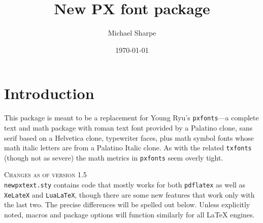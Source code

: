 \documentclass[11pt]{article}
\title{New PX font package}
\author{Michael Sharpe}
\date{\today}  %
\theoremstyle{oldplain}
\theoremstyle{plain}
\def\pcf{\addfontfeatures{Letters=PetiteCaps}}
\begin{document}
%
\maketitle
%
%
%


\section{Introduction}
This package is meant to be  a replacement for Young Ryu's {\tt pxfonts}---a complete text and math package with roman text font provided by a Palatino clone, sans serif based on a \textsf{Helvetica} clone, typewriter faces, plus math symbol fonts whose math italic letters are from a Palatino Italic clone. As with the related {\tt txfonts} (though not as severe) the math metrics in {\tt pxfonts} seem overly tight.

\textsc{Changes as of version 1.5}\\
 {\tt newpxtext.sty} contains code that mostly works for both {\tt pdflatex} as well as {\tt XeLateX} and {\tt LuaLaTeX}, though there are some new features that work only with the last two. The precise differences will be spelled out below. Unless explicitly noted, macros and package options will function similarly for all LaTeX engines.
\end{document}
